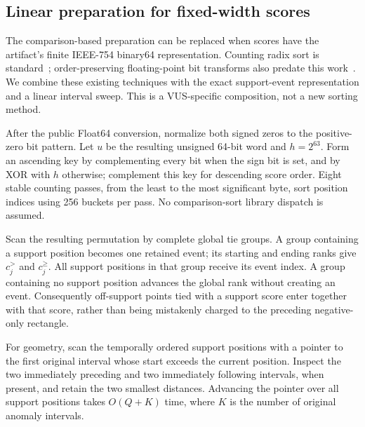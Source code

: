 \subsection{Linear preparation for fixed-width scores}
\label{sec:radix}
The comparison-based preparation can be replaced when scores have the
artifact's finite IEEE-754 binary64 representation. Counting radix sort is
standard~\cite{demaine2011radix}; order-preserving floating-point bit
transforms also predate this work~\cite{herf2001radix}. We combine these
existing techniques with the exact support-event representation and a linear
interval sweep. This is a VUS-specific composition, not a new sorting method.

After the public Float64 conversion, normalize both signed zeros to the
positive-zero bit pattern. Let $u$ be the resulting unsigned 64-bit word and
$h=2^{63}$. Form an ascending key by complementing every bit when the sign
bit is set, and by XOR with $h$ otherwise; complement this key for descending
score order. Eight stable counting passes, from the least to the most
significant byte, sort position indices using 256 buckets per pass. No
comparison-sort library dispatch is assumed.

Scan the resulting permutation by complete global tie groups. A group
containing a support position becomes one retained event; its starting and
ending ranks give $c_j^>$ and $c_j^\ge$. All support positions in that group
receive its event index. A group containing no support position advances the
global rank without creating an event. Consequently off-support points tied
with a support score enter together with that score, rather than being
mistakenly charged to the preceding negative-only rectangle.

For geometry, scan the temporally ordered support positions with a pointer
to the first original interval whose start exceeds the current position.
Inspect the two immediately preceding and two immediately following
intervals, when present, and retain the two smallest distances. Advancing
the pointer over all support positions takes $O(Q+K)$ time, where $K$ is the
number of original anomaly intervals.

